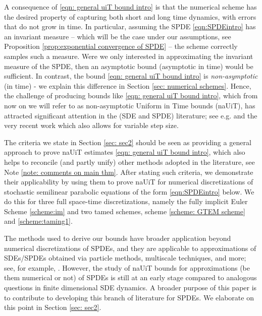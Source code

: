 \documentclass[reqno, 11pt]{amsart}
\theoremstyle{plain}
\theoremstyle{definition}
\theoremstyle{remark}
\numberwithin{equation}{section}
\numberwithin{theorem}{section}
\begin{document}
{A consequence of \eqref{eqn: general uiT bound intro} is that the numerical scheme has the desired property of capturing both short and long time dynamics, with errors that do not grow in time. In particular, assuming the SPDE \eqref{eqn:SPDEintro} has an invariant measure -- which will be the case under our assumptions, see Proposition \ref{prop:exponential convergence of SPDE} -- the scheme  correctly samples such a measure. {Were we only interested in approximating the invariant measure of the SPDE, then an asymptotic bound (asymptotic in time) would be sufficient}.  In contrast, the bound \eqref{eqn: general uiT bound intro}  is {\em{non-asymptotic}} (in time) - we explain this difference in Section \ref{sec: numerical schemes}. Hence, the challenge of producing bounds  like \eqref{eqn: general uiT bound intro}, which from now on we will refer to as non-asymptotic Uniform in Time bounds (naUiT),  has  attracted significant attention in the (SDE and SPDE) literature; see e.g. \cite{glatt2024long, jiang2025uniform, del2025time, del2020backward, schuh2024conditions, Angeli} and the very recent work  \cite{alfonsi2025euler} which also allows for variable step size.

The criteria we state in Section \ref{sec: sec2} should be seen as providing a general approach to prove  naUiT estimates \eqref{eqn: general uiT bound intro}, which also helps to  reconcile (and partly unify) other methods adopted in the literature, see Note \ref{note: comments on main thm}. After stating such criteria, we demonstrate their applicability by using them to prove naUiT for numerical discretizations of stochastic semilinear parabolic equations of the form \eqref{eqn:SPDEintro} below. We do this for three full space-time discretizations, namely the fully implicit Euler Scheme \eqref{scheme:im} and two tamed schemes, scheme \eqref{scheme: GTEM scheme} and \eqref{scheme:taming1}. 

{The methods used to derive our bounds have broader application beyond numerical discretizations of SPDEs, and they are applicable to  approximations of SDEs/SPDEs obtained via particle methods, multiscale techniques, and more; see, for example,  \cite{del2018stability, heydecker2019pathwise, durmus2020elementary, flandoli2022eddy, mischler2013kac, akyildiz2024multiscale, barre2021fast}}. However, the study of naUiT  bounds for approximations (be them numerical or not)  of SPDEs is still at an early stage compared to analogous questions in finite dimensional SDE dynamics. A broader purpose of this paper is to contribute to developing this branch of literature for SPDEs.   We elaborate on this point in Section \ref{sec: sec2}.}
\end{document}
